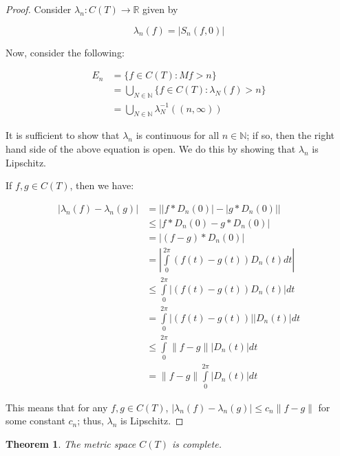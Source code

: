 \documentclass{amsart}
\newcommand{\la}{\lambda}
\newcommand{\N}{\mathbb{N}}
\newcommand{\R}{\mathbb{R}}
\newcommand{\absval}[1]{\left| #1 \right|}
\newcommand{\norm}[1]{\|#1\|}
\newtheorem{thm}{Theorem}[section]
\theoremstyle{definition}
\begin{document}
\begin{proof}
Consider $\la_n: C(T) \to \R$ given by

\begin{displaymath}
\la_n(f) = \absval{S_n(f,0)}
\end{displaymath}

Now, consider the following:

\begin{align*}
E_n &= \{f \in C(T): Mf> n\} \\
&= \bigcup\limits_{N \in \N} \{f \in C(T) : \la_N (f)> n\}\\
&= \bigcup\limits_{N \in \N} \la_N^{-1}((n, \infty))
\end{align*}

It is sufficient to show that $\la_n$ is continuous for all $n \in \N$; if so, then the right hand side of the above equation is open.
We do this by showing that $\la_n$ is Lipschitz.

If $f, g \in C(T)$, then we have:

\begin{align*}
\absval{\la_n(f) - \la_n(g)} &= \absval{\absval{f \ast D_n(0)} - \absval{g \ast D_n(0)}} \\
&\leq \absval{f \ast D_n(0) - g \ast D_n(0)} \\
&= \absval{(f-g) \ast D_n(0)} \\
&= \absval{\int\limits_0^{2\pi} (f(t)-g(t))D_n(t)dt} \\
&\leq \int\limits_0^{2\pi} \absval{(f(t)-g(t))D_n(t)}dt \\
&= \int\limits_0^{2\pi} \absval{(f(t)-g(t))}\absval{D_n(t)}dt \\
&\leq \int\limits_0^{2\pi} \norm{f-g}\absval{D_n(t)}dt \\
&= \norm{f-g} \int\limits_0^{2\pi} \absval{D_n(t)}dt
\end{align*}

This means that for any $f,g \in C(T)$, $\absval{\la_n(f) - \la_n(g)} \leq c_n \norm{f-g}$ for some constant $c_n$; thus, $\la_n$ is Lipschitz.

\end{proof}

\begin{thm}
The metric space $C(T)$ is complete.
\end{thm}
\end{document}
